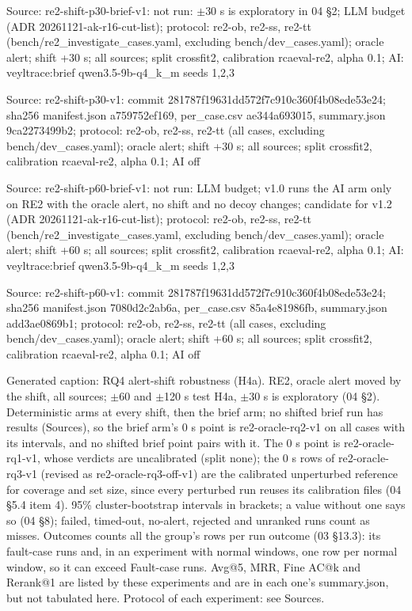 \noindent Source: re2-shift-p30-brief-v1: not run: $\pm$30 s is exploratory in 04 \S{}2; LLM budget (ADR 20261121-ak-r16-cut-list); protocol: re2-ob, re2-ss, re2-tt (bench/\allowbreak{}re2\_investigate\_cases.yaml, excluding bench/\allowbreak{}dev\_cases.yaml); oracle alert; shift +30 s; all sources; split crossfit2, calibration rcaeval-re2, alpha 0.1; AI: veyltrace:brief qwen3.5-9b-q4\_k\_m seeds 1,2,3\par
\noindent Source: re2-shift-p30-v1: commit 281787f19631dd572f7c910c360f4b08ede53e24; sha256 manifest.json a759752ef169, per\_case.csv ae344a693015, summary.json 9ca2273499b2; protocol: re2-ob, re2-ss, re2-tt (all cases, excluding bench/\allowbreak{}dev\_cases.yaml); oracle alert; shift +30 s; all sources; split crossfit2, calibration rcaeval-re2, alpha 0.1; AI off\par
\noindent Source: re2-shift-p60-brief-v1: not run: LLM budget; v1.0 runs the AI arm only on RE2 with the oracle alert, no shift and no decoy changes; candidate for v1.2 (ADR 20261121-ak-r16-cut-list); protocol: re2-ob, re2-ss, re2-tt (bench/\allowbreak{}re2\_investigate\_cases.yaml, excluding bench/\allowbreak{}dev\_cases.yaml); oracle alert; shift +60 s; all sources; split crossfit2, calibration rcaeval-re2, alpha 0.1; AI: veyltrace:brief qwen3.5-9b-q4\_k\_m seeds 1,2,3\par
\noindent Source: re2-shift-p60-v1: commit 281787f19631dd572f7c910c360f4b08ede53e24; sha256 manifest.json 7080d2c2ab6a, per\_case.csv 85a4e81986fb, summary.json add3ae0869b1; protocol: re2-ob, re2-ss, re2-tt (all cases, excluding bench/\allowbreak{}dev\_cases.yaml); oracle alert; shift +60 s; all sources; split crossfit2, calibration rcaeval-re2, alpha 0.1; AI off\par
\noindent Generated caption: RQ4 alert-shift robustness (H4a). RE2, oracle alert moved by the shift, all sources; $\pm$60 and $\pm$120 s test H4a, $\pm$30 s is exploratory (04 \S{}2). Deterministic arms at every shift, then the brief arm; no shifted brief run has results (Sources), so the brief arm's 0 s point is re2-oracle-rq2-v1 on all cases with its intervals, and no shifted brief point pairs with it. The 0 s point is re2-oracle-rq1-v1, whose verdicts are uncalibrated (split none); the 0 s rows of re2-oracle-rq3-v1 (revised as re2-oracle-rq3-off-v1) are the calibrated unperturbed reference for coverage and set size, since every perturbed run reuses its calibration files (04 \S{}5.4 item 4). 95\% cluster-bootstrap intervals in brackets; a value without one says so (04 \S{}8); failed, timed-out, no-alert, rejected and unranked runs count as misses. Outcomes counts all the group's rows per run outcome (03 \S{}13.3): its fault-case runs and, in an experiment with normal windows, one row per normal window, so it can exceed Fault-case runs. Avg@5, MRR, Fine AC@k and Rerank@1 are listed by these experiments and are in each one's summary.json, but not tabulated here. Protocol of each experiment: see Sources.\par
\endgroup

